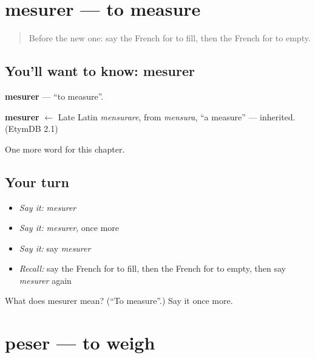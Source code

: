 \section[mesurer]{mesurer — to measure}

\label{lesson:FR-C234-mesurer}



\begin{quote}
Before the new one: say the French for to fill, then the French for to empty.
\end{quote}

\subsection*{You'll want to know: mesurer}
\textbf{mesurer} — \textquotedblleft{}to measure\textquotedblright{}.

\begin{cousinweb}
\textbf{mesurer} $\leftarrow$ Late Latin \emph{mensurare}, from \emph{mensura}, \textquotedblleft{}a measure\textquotedblright{} — inherited. (EtymDB 2.1)
\end{cousinweb}

\begin{grammarlens}[title={What you've built}]
One more word for this chapter.
\end{grammarlens}

\subsection*{Your turn}
\begin{itemize}
\raggedright
  \item \emph{Say it:} \emph{mesurer}
  \item \emph{Say it:} \emph{mesurer}, once more
  \item \emph{Say it:} say \emph{mesurer}
  \item \emph{Recall:} say the French for to fill, then the French for to empty, then say \emph{mesurer} again
\end{itemize}

\begin{tcolorbox}[breakable,colback=teal!4,colframe=teal!35!black,title={Before you move on}]
What does mesurer mean? (\textquotedblleft{}To measure\textquotedblright{}.) Say it once more.
\end{tcolorbox}
\section[peser]{peser — to weigh}

